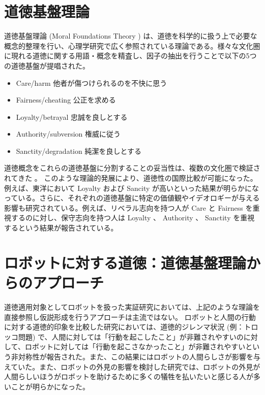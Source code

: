 \documentclass[a4j,12pt]{jreport}
\begin{document}
\section{道徳基盤理論}
道徳基盤理論 (Moral Foundations Theory \cite{MFT}) は、道徳を科学的に扱う上で必要な概念的整理を行い、心理学研究で広く参照されている理論である。様々な文化圏に現れる道徳に関する用語・概念を精査し、因子の抽出を行うことで以下の5つの道徳基盤が提唱された。
\begin{itemize}
\item Care/harm 他者が傷つけられるのを不快に思う
\item Fairness/cheating 公正を求める
\item Loyalty/betrayal 忠誠を良しとする
\item Authority/subversion 権威に従う
\item Sanctity/degradation 純潔を良しとする
\end{itemize}
道徳概念をこれらの道徳基盤に分割することの妥当性は、複数の文化圏で検証されてきた\cite{jpmft, frmft} 。
このような理論的発展により、道徳性の国際比較が可能になった。例えば、東洋において Loyalty および Sancity が高いといった結果が明らかになっている\cite{mfcr}。さらに、それぞれの道徳基盤に特定の価値観やイデオロギーが与える影響も研究されている。例えば、リベラル志向を持つ人が Care と Fairness を重視するのに対し、保守志向を持つ人は Loyalty 、 Authority 、 Sanctity を重視するという結果が報告されている\cite{ideo_}。


\section{ロボットに対する道徳：道徳基盤理論からのアプローチ}
道徳適用対象としてロボットを扱った実証研究においては、上記のような理論を直接参照し仮説形成を行うアプローチは主流ではない。
ロボットと人間の行動に対する道徳的印象を比較した研究\cite{tro}においては、道徳的ジレンマ状況 (例：トロッコ問題) で、人間に対しては「行動を起こしたこと」が非難されやすいのに対して、ロボットに対しては「行動を起こさなかったこと」が非難されやすいという非対称性が報告された。また、この結果にはロボットの人間らしさが影響を与えていた。また、ロボットの外見の影響を検討した研究\cite{appe}では、ロボットの外見が人間らしいほうがロボットを助けるために多くの犠牲を払いたいと感じる人が多いことが明らかになった。
\end{document}
